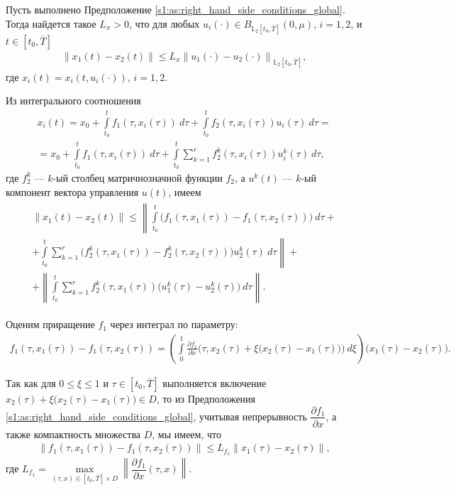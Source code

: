 \documentclass[../main.tex]{subfiles}
\begin{document}
\begin{lemma}\label{s1:lem:lip_of_solutions_global}
 Пусть выполнено Предположение \ref{s1:as:right_hand_side_conditions_global}.
 Тогда найдется такое $L_x > 0$, что для любых $u_i(\cdot) \in B_{\mathbb{L}_2[t_0, \overline{T}]}(0,\mu) $, $i = 1,2$, и $t \in [t_0, \overline{T}]$
 \begin{gather*}
 \left\| x_1(t) - x_2(t) \right\| \leqslant L_x \left\|u_1(\cdot) - u_2(\cdot) \right\|_{\mathbb{L}_2[t_0, \overline{T}]}, 
 \end{gather*}
 где $x_i(t) = x_i(t,u_i(\cdot))$, $i = 1,2$. 
\end{lemma}
\doc
Из интегрального соотношения
\begin{gather*}
 x_i(t) = x_0 
 + \int\limits_{t_0}^{t} f_1(\tau, x_i(\tau))\ d\tau 
 + \int\limits_{t_0}^{t} f_2(\tau,x_i(\tau))u_i(\tau)\ d\tau 
 = \\ = 
 x_0 
 + \int\limits_{t_0}^{t} f_1(\tau, x_i(\tau))\ d\tau 
 + \int\limits_{t_0}^{t} 
 \sum\limits_{k = 1}^{r} 
 f_2^k(\tau,x_i(\tau))u_i^k(\tau)\ d\tau,
\end{gather*}
где $f_2^k$ --- $k$-ый столбец матричнозначной функции $f_2$, а $u^k(t)$ --- $k$-ый компонент вектора управления $u(t)$, имеем 
\begin{gather}\label{s1:diff_of_solution}
\begin{gathered}
 \| x_1(t) - x_2(t) \| 
 \leqslant 
 \left\| 
 \int\limits_{t_0}^{t} \Big( f_1(\tau, x_1(\tau)) - f_1(\tau, x_2(\tau)) \Big) \ d\tau 
 \right.
 + \\ + 
 \left.
 \int\limits_{t_0}^{t} 
 \sum\limits_{k = 1}^{r}
 \Big( f_2^k(\tau, x_1(\tau)) - f_2^k(\tau, x_2(\tau)) \Big) u_2^k(\tau) \ d\tau 
 \right\| 
 + \\ +
 \left\| 
 \int\limits_{t_0}^{t} 
 \sum\limits_{k = 1}^{r}
 f_2^k(\tau,x_1(\tau)) \big( u_1^k(\tau) - u_2^k(\tau) \big) \ d\tau 
 \right\|. 
\end{gathered}
\end{gather}

Оценим приращение $f_1$ через интеграл по параметру:
\begin{gather}\label{s1:meanvalue_f1}
		f_1(\tau, x_1(\tau)) - f_1(\tau, x_2(\tau)) = \left( \int\limits_0^1 \frac{\partial f_1}{\partial x} \Big(\tau, x_2(\tau) + \xi \big(x_2(\tau) - x_1(\tau)\big)\Big) \ d\xi \right) \big(x_1(\tau) - x_2(\tau)\big).
\end{gather}

Так как для $0 \leqslant \xi \leqslant 1 $ и $\tau \in [t_0,\overline{T}]$ выполняется включение $x_2(\tau) + \xi \big(x_2(\tau) - x_1(\tau)\big) \in D$, то из Предположения \ref{s1:as:right_hand_side_conditions_global}, учитывая непрерывность $\dfrac{\partial f_1}{\partial x} $, а также компактность множества $D$, мы имеем, что 
\begin{gather}\label{s1:lip_f1}
		\big\| f_1(\tau, x_1(\tau)) - f_1(\tau, x_2(\tau)) \big\| \leqslant L_{f_1} \|x_1(\tau) - x_2(\tau)\|,
\end{gather}
где $L_{f_1} = \max\limits_{(\tau, x ) \in [t_0, \overline{T}] \times D} \left\| \dfrac{\partial f_1}{\partial x} (\tau, x) \right\| $.
\end{document}
